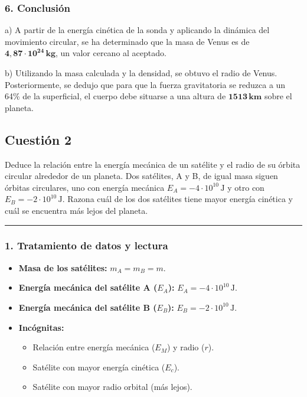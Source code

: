 \subsubsection*{6. Conclusión}
\begin{cajaconclusion}
a) A partir de la energía cinética de la sonda y aplicando la dinámica del movimiento circular, se ha determinado que la masa de Venus es de $\mathbf{4,87 \cdot 10^{24} \, kg}$, un valor cercano al aceptado.

b) Utilizando la masa calculada y la densidad, se obtuvo el radio de Venus. Posteriormente, se dedujo que para que la fuerza gravitatoria se reduzca a un 64\% de la superficial, el cuerpo debe situarse a una altura de $\mathbf{1513 \, km}$ sobre el planeta.
\end{cajaconclusion}

\newpage

\subsection{Cuestión 2}
\label{subsec:C2_2022_jul_ord}

\begin{cajaenunciado}
Deduce la relación entre la energía mecánica de un satélite y el radio de su órbita circular alrededor de un planeta. Dos satélites, A y B, de igual masa siguen órbitas circulares, uno con energía mecánica $E_A = -4\cdot10^{10}\,\text{J}$ y otro con $E_B = -2\cdot10^{10}\,\text{J}$. Razona cuál de los dos satélites tiene mayor energía cinética y cuál se encuentra más lejos del planeta.
\end{cajaenunciado}
\hrule

\subsubsection*{1. Tratamiento de datos y lectura}
\begin{itemize}
    \item \textbf{Masa de los satélites:} $m_A = m_B = m$.
    \item \textbf{Energía mecánica del satélite A ($E_A$):} $E_A = -4 \cdot 10^{10}\,\text{J}$.
    \item \textbf{Energía mecánica del satélite B ($E_B$):} $E_B = -2 \cdot 10^{10}\,\text{J}$.
    \item \textbf{Incógnitas:}
    \begin{itemize}
        \item Relación entre energía mecánica ($E_M$) y radio ($r$).
        \item Satélite con mayor energía cinética ($E_c$).
        \item Satélite con mayor radio orbital (más lejos).
    \end{itemize}
\end{itemize}


